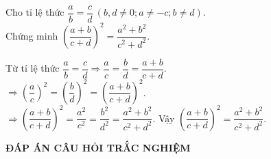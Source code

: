 		\begin{ex}%
			Cho tỉ lệ thức $\dfrac{a}{b} = \dfrac{c}{d}\ (b, d \neq 0; a \neq -c; b \neq d)$.\\
			 Chứng minh $\left( \dfrac{a+b}{c+d}\right)^2 = \dfrac{a^2+b^2}{c^2+d^2}.$
			\loigiai
			{
			Từ tỉ lệ thức $\dfrac{a}{b} = \dfrac{c}{d} \Rightarrow \dfrac{a}{c} = \dfrac{b}{d} = \dfrac{a+b}{c+d}$.\\
			$\Rightarrow \left( \dfrac{a}{c}\right)^2 = \left(\dfrac{b}{d}\right) ^2 = \left( \dfrac{a+b}{c+d} \right)^2$.\\
			$\Rightarrow \left( \dfrac{a+b}{c+d} \right)^2 = \dfrac{a^2}{c^2} = \dfrac{b^2}{d^2} = \dfrac{a^2+b^2}{c^2+d^2}$.
			Vậy $\left(\dfrac{a+b}{c+d}\right)^2 
 =\dfrac{a^2 + b^2}{c^2+d^2}$.			
	
	
}
\end{ex}

	
	\begin{center}
		\textbf{ĐÁP ÁN CÂU HỎI TRẮC NGHIỆM}
	\end{center}
	\boxans
	